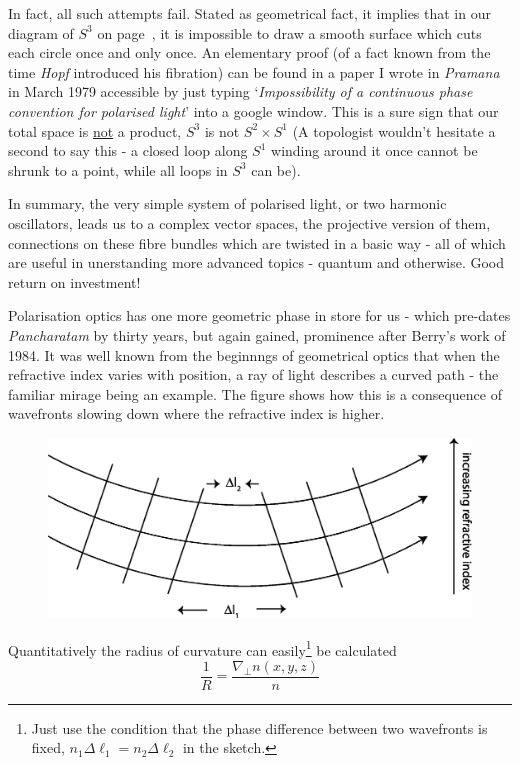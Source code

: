 In fact, all such attempts fail. Stated as geometrical fact, it implies that
in our diagram of $S^3$ on page~\pageref{diags3}, it is impossible to draw a smooth surface which
cuts each circle once and only once. An elementary proof (of a fact known
from the time \textit{Hopf} introduced his fibration) can be found in a paper I wrote in
\textit{Pramana} in March 1979 accessible by just typing `\textit{Impossibility of a continuous
phase convention for polarised light}' into a google window. This is a sure sign
that our total space is \underline{not} a product, $S^3$ is not $S^2 \times S^1$ (A topologist wouldn't
hesitate a second to say this - a closed loop along $S^1$ winding around it once
cannot be shrunk to a point, while all loops in $S^3$ can be).

In summary, the very simple system of polarised light, or two harmonic
oscillators, leads us to a complex vector spaces, the projective version of them,
connections on these fibre bundles which are twisted in a basic way - all of which
are useful in unerstanding more advanced topics - quantum and otherwise. Good
return on investment!

Polarisation optics has one more geometric phase in store for us - which pre-dates \textit{Pancharatam} by thirty years, but again gained, prominence after Berry's work of 1984. It was well known from the beginnngs of geometrical optics that
when the refractive index varies with position, a ray of light describes a curved
path - the familiar mirage being an example. The figure shows how this is a consequence of
wavefronts slowing down where the refractive index is higher.
\bigskip

\begin{figure}[H]
\centering
\includegraphics[scale=0.19]{src/images/chap26/19.jpg}
\end{figure}
\bigskip

Quantitatively the radius of curvature can easily\footnote{Just use the condition that the phase difference between two wavefronts is fixed, $n_1 \Delta \ell_1 = n_2 \Delta \ell_2$ in the sketch.} be calculated
$$
\frac{1}{R} = \frac{\nabla_\perp n (x,y,z)}{n}
$$

